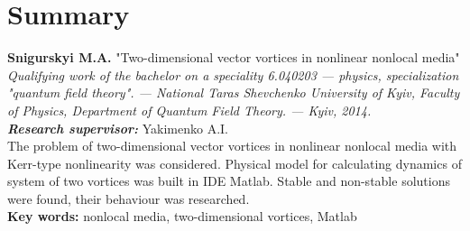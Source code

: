 \thispagestyle{empty}
\section*{Summary}

  {\bf Snigurskyi M.A.} "Two-dimensional vector vortices in nonlinear nonlocal media"\\
  {\itshape Qualifying work of the bachelor on a speciality 6.040203 --- physics, specialization "quantum field theory". --- National Taras Shevchenko University of Kyiv, Faculty of Physics, Department of Quantum Field Theory. --- Kyiv, 2014.\\}
  {\itshape \bfseries Research supervisor:} Yakimenko A.I.\\%

  The problem of two-dimensional vector vortices in nonlinear nonlocal media with Kerr-type nonlinearity was considered. Physical model for calculating dynamics of system of two vortices was built in IDE Matlab. Stable and non-stable solutions were found, their behaviour was researched.\\[1.5cm]
  {\bf Key words:} nonlocal media, two-dimensional vortices, Matlab\\
